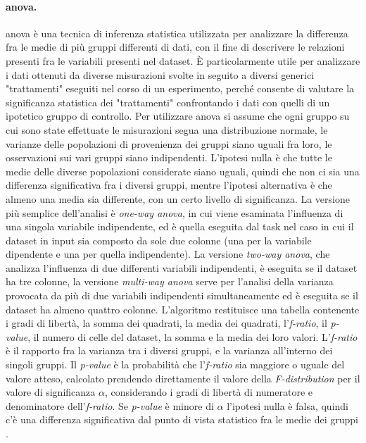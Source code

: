 \documentclass[12pt,a4paper,fleqn,titlepage]{report}
\begin{document}
        \paragraph{\gls{anova}.}
        \gls{anova} è una tecnica di inferenza statistica utilizzata per analizzare la differenza fra le medie di più gruppi differenti di dati, con il fine di descrivere le relazioni presenti fra le variabili presenti nel dataset. È particolarmente utile per analizzare i dati ottenuti da diverse misurazioni svolte in seguito a diversi generici "trattamenti" eseguiti nel corso di un esperimento, perché consente di valutare la significanza statistica dei "trattamenti" confrontando i dati con quelli di un ipotetico gruppo di controllo. Per utilizzare \gls{anova} si assume che ogni gruppo su cui sono state effettuate le misurazioni segua una distribuzione normale, le varianze delle popolazioni di provenienza dei gruppi siano uguali fra loro, le osservazioni sui vari gruppi siano indipendenti. L'ipotesi nulla è che tutte le medie delle diverse popolazioni considerate siano uguali, quindi che non ci sia una differenza significativa fra i diversi gruppi, mentre l'ipotesi alternativa è che almeno una media sia differente, con un certo livello di significanza.
        La versione più semplice dell'analisi è \emph{one-way \gls{anova}}, in cui viene esaminata l'influenza di una singola variabile indipendente, ed è quella eseguita dal task nel caso in cui il dataset in input sia composto da sole due colonne (una per la variabile dipendente e una per quella indipendente). La versione \emph{two-way \gls{anova}}, che analizza l'influenza di due differenti variabili indipendenti, è eseguita se il dataset ha tre colonne, la versione \emph{multi-way \gls{anova}} serve per l'analisi della varianza provocata da più di due variabili indipendenti simultaneamente ed è eseguita se il dataset ha almeno quattro colonne.
        L'algoritmo restituisce una tabella contenente i gradi di libertà, la somma dei quadrati, la media dei quadrati, l'\emph{f-ratio}, il \emph{p-value}, il numero di celle del dataset, la somma e la media dei loro valori. L'\emph{f-ratio} è il rapporto fra la varianza tra i diversi gruppi, e la varianza all'interno dei singoli gruppi. Il \emph{p-value} è la probabilità che l'\emph{f-ratio} sia maggiore o uguale del valore atteso, calcolato prendendo direttamente il valore della \emph{F-distribution} per il valore di significanza $\alpha$, considerando i gradi di libertà di numeratore e denominatore dell'\emph{f-ratio}. Se \emph{p-value} è minore di $\alpha$ l'ipotesi nulla è falsa, quindi c'è una differenza significativa dal punto di vista statistico fra le medie dei gruppi \cite{scheffe:1999}.
\end{document}
